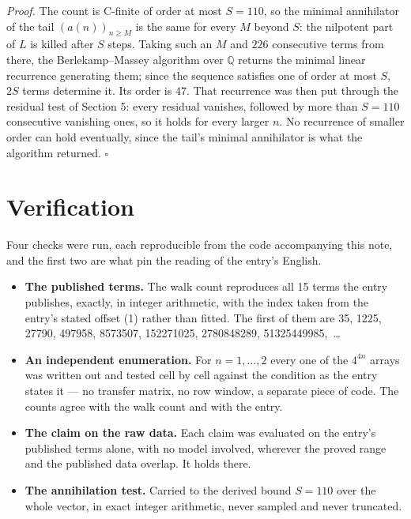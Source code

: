 \documentclass[11pt]{article}
\theoremstyle{definition}
\begin{document}
{\itshape Proof.} The count is C-finite of order at most $S = 110$, so the minimal annihilator of the tail $(a(n))_{n \ge M}$ is the same for every $M$ beyond $S$: the nilpotent part of $L$ is killed after $S$ steps. Taking such an $M$ and $226$ consecutive terms from there, the Berlekamp--Massey algorithm over $\mathbb{Q}$ returns the minimal linear recurrence generating them; since the sequence satisfies one of order at most $S$, $2S$ terms determine it. Its order is $47$. That recurrence was then put through the residual test of Section 5: every residual vanishes, followed by more than $S = 110$ consecutive vanishing ones, so it holds for every larger $n$. No recurrence of smaller order can hold eventually, since the tail's minimal annihilator is what the algorithm returned. $\square$

\section{Verification}

Four checks were run, each reproducible from the code accompanying this note, and the first two are what pin the reading of the entry's English.

\begin{itemize}

\item {\bfseries The published terms.} The walk count reproduces all 15 terms the entry publishes, exactly, in integer arithmetic, with the index taken from the entry's stated offset (1) rather than fitted. The first of them are 35, 1225, 27790, 497958, 8573507, 152271025, 2780848289, 51325449985,~\dots

\item {\bfseries An independent enumeration.} For $n = 1,\dots,2$ every one of the $4^{4n}$ arrays was written out and tested cell by cell against the condition as the entry states it --- no transfer matrix, no row window, a separate piece of code. The counts agree with the walk count and with the entry.

\item {\bfseries The claim on the raw data.} Each claim was evaluated on the entry's published terms alone, with no model involved, wherever the proved range and the published data overlap. It holds there.

\item {\bfseries The annihilation test.} Carried to the derived bound $S = 110$ over the whole vector, in exact integer arithmetic, never sampled and never truncated.

\end{itemize}
\end{document}
